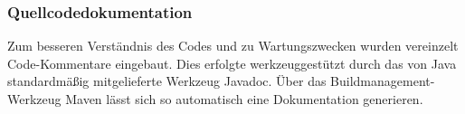 \subsubsection{Quellcodedokumentation}
\label{sec:Quellcodedokumentation}
Zum besseren Verständnis des Codes und zu Wartungszwecken wurden vereinzelt Code-Kommentare eingebaut. Dies erfolgte werkzeuggestützt durch das von Java standardmäßig mitgelieferte Werkzeug Javadoc. Über das Buildmanagement-Werkzeug Maven lässt sich so automatisch eine Dokumentation generieren.


\newpage